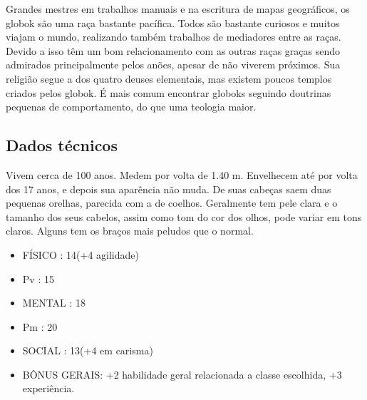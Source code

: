 Grandes mestres em trabalhos manuais e na escritura de mapas geográficos, os globok são uma raça bastante pacífica. Todos são bastante curiosos e muitos viajam o mundo, realizando também trabalhos de mediadores entre as raças. Devido a isso têm um bom relacionamento com as outras raças graças sendo admirados principalmente pelos anões, apesar de não viverem próximos. Sua religião segue a dos quatro deuses elementais, mas existem poucos templos criados pelos globok. É mais comum encontrar globoks seguindo doutrinas pequenas de comportamento, do que uma teologia maior. 


\subsection{Dados técnicos}


Vivem cerca de 100 anos. Medem por volta de 1.40 m. Envelhecem até por volta dos 17 anos, e depois sua aparência não muda. De suas cabeças saem duas pequenas orelhas, parecida com a de coelhos. Geralmente tem pele clara e o tamanho dos seus cabelos, assim como tom do cor dos olhos, pode variar em tons claros. Alguns tem os braços mais peludos que o normal.


\begin{itemize}


\item FÍSICO : 14(+4 agilidade)
\item Pv : 15 

\item MENTAL : 18
\item Pm : 20

\item SOCIAL : 13(+4 em carisma)

\item BÔNUS GERAIS: +2 habilidade geral relacionada a classe escolhida, +3 experiência.


\end{itemize}